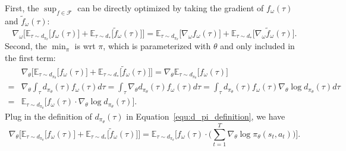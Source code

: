 First, the $\sup_{f\in\mathcal{F}}$ can be directly optimized by taking the gradient of $f_{\omega}(\tau)$ and $\tilde{f}_{\omega}(\tau)$: 
\begin{equation*}
\nabla_{\omega} \Big[ \mathbb{E}_{\tau\sim d_{\pi_{\theta}}} \big[ f_{\omega}(\tau) \big] + \mathbb{E}_{\tau\sim d_*} \big[ \tilde{f}_{\omega}(\tau) \big] \Big]
= \mathbb{E}_{\tau\sim d_{\pi_{\theta}}} \big[ \nabla_{\omega} f_{\omega}(\tau) \big] + \mathbb{E}_{\tau\sim d_*} \big[ \nabla_{\omega} \tilde{f}_{\omega}(\tau) \big].
\end{equation*}
Second, the $\min_{\pi}$ is wrt $\pi$, which is parameterized with $\theta$ and only included in the first term:
\begin{align*}
& \nabla_{\theta} \Big[ \mathbb{E}_{\tau\sim d_{\pi_{\theta}}} \big[ f_{\omega}(\tau) \big] + \mathbb{E}_{\tau\sim d_*} \big[ \tilde{f}_{\omega}(\tau) \big] \Big] 
= \nabla_{\theta} \mathbb{E}_{\tau\sim d_{\pi_{\theta}}} \big[ f_{\omega}(\tau) \big] \\
= & \nabla_{\theta} \int_{\tau} d_{\pi_{\theta}}(\tau) f_{\omega}(\tau) d\tau 
= \int_{\tau} \nabla_{\theta} d_{\pi_{\theta}}(\tau) f_{\omega}(\tau) d\tau 
= \int_{\tau}  d_{\pi_{\theta}}(\tau) f_{\omega}(\tau) \nabla_{\theta}\log d_{\pi_{\theta}}(\tau)  d\tau \\
= & \mathbb{E}_{\tau\sim d_{\pi_\theta}} \big[ f_{\omega}(\tau) \cdot \nabla_{\theta}\log d_{\pi_{\theta}}(\tau) \big].
\end{align*}
Plug in the definition of $d_{\pi_{\theta}}(\tau)$ in Equation~\ref{equ:d_pi_definition}, we have
\begin{equation*}
\nabla_{\theta} \Big[ \mathbb{E}_{\tau\sim d_{\pi_{\theta}}} \big[ f_{\omega}(\tau) \big] + \mathbb{E}_{\tau\sim d_*} \big[ \tilde{f}_{\omega}(\tau) \big] \Big] 
= \mathbb{E}_{\tau\sim d_{\pi_\theta}} \Big[ f_{\omega}(\tau) \cdot \big( \sum_{t=1}^{T}\nabla_{\theta}\log \pi_{\theta}(s_t, a_t) \big) \Big].
\end{equation*}

